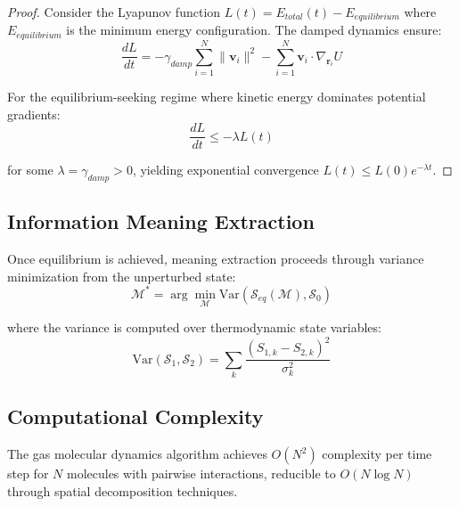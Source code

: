 \begin{proof}
Consider the Lyapunov function $L(t) = E_{total}(t) - E_{equilibrium}$ where $E_{equilibrium}$ is the minimum energy configuration. The damped dynamics ensure:
\begin{equation}
\frac{dL}{dt} = -\gamma_{damp} \sum_{i=1}^{N} \|\mathbf{v}_i\|^2 - \sum_{i=1}^{N} \mathbf{v}_i \cdot \nabla_{\mathbf{r}_i} U
\end{equation}

For the equilibrium-seeking regime where kinetic energy dominates potential gradients:
\begin{equation}
\frac{dL}{dt} \leq -\lambda L(t)
\end{equation}

for some $\lambda = \gamma_{damp} > 0$, yielding exponential convergence $L(t) \leq L(0) e^{-\lambda t}$.
\end{proof}

\subsection{Information Meaning Extraction}

Once equilibrium is achieved, meaning extraction proceeds through variance minimization from the unperturbed state:
\begin{equation}
\mathcal{M}^* = \arg\min_{\mathcal{M}} \text{Var}(\mathcal{S}_{eq}(\mathcal{M}), \mathcal{S}_0)
\label{eq:meaning-extraction}
\end{equation}

where the variance is computed over thermodynamic state variables:
\begin{equation}
\text{Var}(\mathcal{S}_1, \mathcal{S}_2) = \sum_{k} \frac{(S_{1,k} - S_{2,k})^2}{\sigma_k^2}
\label{eq:thermodynamic-variance}
\end{equation}

\subsection{Computational Complexity}

\begin{theorem}
The gas molecular dynamics algorithm achieves $O(N^2)$ complexity per time step for $N$ molecules with pairwise interactions, reducible to $O(N \log N)$ through spatial decomposition techniques.
\end{theorem}

